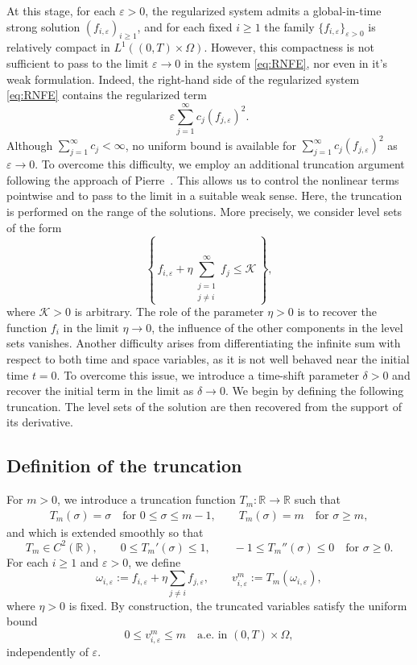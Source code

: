 \documentclass[a4paper,12pt,reqno]{amsart}
\theoremstyle{plain}
\numberwithin{equation}{section}
\begin{document}
	At this stage, for each $\varepsilon>0$, the regularized system admits a global-in-time strong solution $(f_{i,\varepsilon})_{i\ge1}$, and for each fixed $i\ge1$ the
	family $\{f_{i,\varepsilon}\}_{\varepsilon>0}$ is relatively compact in
	$L^1((0,T)\times\Omega)$. However, this compactness is not sufficient to pass to
	the limit $\varepsilon\to0$ in the system \eqref{eq:RNFE}, nor even in it's weak formulation. Indeed, the right-hand side of the regularized system \eqref{eq:RNFE} contains the regularized term
	\[
	\varepsilon \sum_{j=1}^{\infty} c_j (f_{j,\varepsilon})^2.
	\]
	Although $\sum_{j=1}^{\infty} c_j < \infty$, no uniform bound is available for
	$\sum_{j=1}^{\infty} c_j (f_{j,\varepsilon})^2$ as $\varepsilon\to0$.
	\newline
	To overcome this difficulty, we employ an additional truncation argument following the
	approach of Pierre~\cite{Pierre2010}. This allows us to control the nonlinear terms
	pointwise and to pass to the limit in a suitable weak sense. Here, the truncation is
	performed on the range of the solutions. More precisely, we consider level sets of the
	form
	\[
	\left\{\, f_{i,\varepsilon} + \eta \sum_{\substack{j=1 \\ j \neq i}}^{\infty} f_j \le
	\mathcal{K} \,\right\},
	\]
	where $\mathcal{K} > 0$ is arbitrary. The role of the parameter $\eta > 0$ is to recover
	the function $f_i$ in the limit $\eta \to 0$, the
	influence of the other components in the level sets vanishes. Another difficulty arises from differentiating the infinite sum with respect to both time and space variables, as it is not well behaved near the initial time $t = 0$. To overcome this issue, we introduce a time-shift parameter $\delta > 0$ and recover the initial term
	in the limit as $\delta \to 0$. We begin by defining the following truncation. The level sets of the solution are then recovered from the support of its derivative.
	
	
	
	\subsection{Definition of the truncation}
	
	For $m>0$, we introduce a truncation function $T_m:\mathbb{R}\to\mathbb{R}$ such
	that
	\begin{align}\label{m_trunction}
		T_m(\sigma)=\sigma \quad \text{for } 0\le \sigma \le m-1,
		\qquad
		T_m(\sigma)=m \quad \text{for } \sigma \ge m,
	\end{align}
	and which is extended smoothly so that
	\[
	T_m \in C^2(\mathbb{R}), \qquad
	0 \le T_m'(\sigma) \le 1,
	\qquad
	-1 \le T_m''(\sigma) \le 0
	\quad \text{for } \sigma \ge 0.
	\]
	For each $i\ge1$ and $\varepsilon>0$, we define
	\[
	\omega_{i,\varepsilon}
	:= f_{i,\varepsilon}
	+ \eta \sum_{j\neq i} f_{j,\varepsilon},
	\qquad
	v^m_{i,\varepsilon}
	:= T_m(\omega_{i,\varepsilon}),
	\]
	where $\eta>0$ is fixed.
	\newline
	By construction, the truncated variables satisfy the uniform bound
	\[
	0 \le v^m_{i,\varepsilon} \le m
	\quad \text{a.e. in } (0,T)\times\Omega,
	\]
	independently of $\varepsilon$.
	
\end{document}
